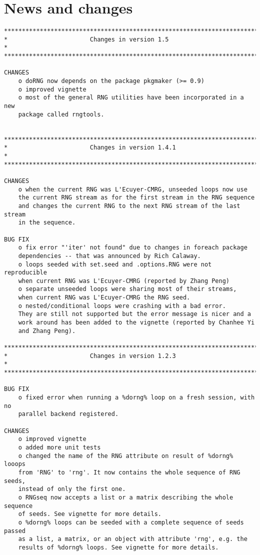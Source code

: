 \documentclass[a4paper,12pt]{article}\usepackage[]{graphicx}\usepackage[]{color}
\begin{document}
\section{News and changes}

{\scriptsize
\begin{verbatim}
*************************************************************************
*                       Changes in version 1.5                          *
*************************************************************************

CHANGES
    o doRNG now depends on the package pkgmaker (>= 0.9)
    o improved vignette
    o most of the general RNG utilities have been incorporated in a new
    package called rngtools.
    

*************************************************************************
*                       Changes in version 1.4.1                        *
*************************************************************************

CHANGES
    o when the current RNG was L'Ecuyer-CMRG, unseeded loops now use 
    the current RNG stream as for the first stream in the RNG sequence 
    and changes the current RNG to the next RNG stream of the last stream 
    in the sequence. 

BUG FIX
    o fix error "'iter' not found" due to changes in foreach package 
    dependencies -- that was announced by Rich Calaway.
    o loops seeded with set.seed and .options.RNG were not reproducible
    when current RNG was L'Ecuyer-CMRG (reported by Zhang Peng)
    o separate unseeded loops were sharing most of their streams, 
    when current RNG was L'Ecuyer-CMRG the RNG seed.
    o nested/conditional loops were crashing with a bad error. 
    They are still not supported but the error message is nicer and a 
    work around has been added to the vignette (reported by Chanhee Yi 
    and Zhang Peng).

*************************************************************************
*                       Changes in version 1.2.3                        *
*************************************************************************

BUG FIX
    o fixed error when running a %dorng% loop on a fresh session, with no  
    parallel backend registered.  

CHANGES
    o improved vignette
    o added more unit tests
    o changed the name of the RNG attribute on result of %dorng% looops 
    from 'RNG' to 'rng'. It now contains the whole sequence of RNG seeds, 
    instead of only the first one.
    o RNGseq now accepts a list or a matrix describing the whole sequence 
    of seeds. See vignette for more details.
    o %dorng% loops can be seeded with a complete sequence of seeds passed 
    as a list, a matrix, or an object with attribute 'rng', e.g. the 
    results of %dorng% loops. See vignette for more details.
    

\end{verbatim}}
\end{document}
